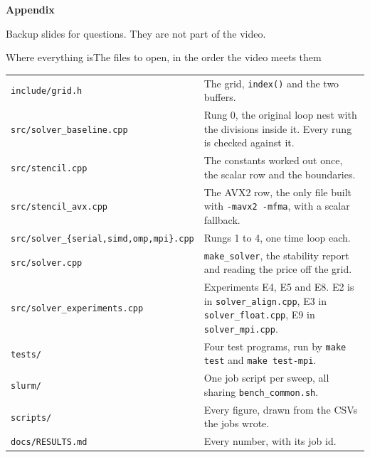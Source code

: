 \documentclass[aspectratio=169,11pt]{beamer}
\newcounter{siglastframe}
\newif\ifsigappendix
\newcommand{\sigbackupbegin}{\setcounter{siglastframe}{\value{framenumber}}\sigappendixtrue}
\begin{document}

\appendix
\sigbackupbegin

\begin{frame}[plain]
  \vfill
  \centering
  {\Large\color{sigink}\bfseries Appendix}
  \par\vspace{0.6em}
  {\color{sigslate} Backup slides for questions. They are not part of the video.}
  \vfill
\end{frame}

\begin{frame}{Where everything is}{The files to open, in the order the video meets them}
  {\footnotesize
  \renewcommand{\arraystretch}{1.12}
  \begin{tabularx}{\linewidth}{@{}l X@{}}
    \toprule
    \texttt{include/grid.h} & The grid, \texttt{index()} and the two buffers. \\
    \texttt{src/solver\_baseline.cpp} & Rung 0, the original loop nest with the divisions inside it. Every rung is checked against it. \\
    \texttt{src/stencil.cpp} & The constants worked out once, the scalar row and the boundaries. \\
    \texttt{src/stencil\_avx.cpp} & The AVX2 row, the only file built with \texttt{-mavx2 -mfma}, with a scalar fallback. \\
    \texttt{src/solver\_\{serial,simd,omp,mpi\}.cpp} & Rungs 1 to 4, one time loop each. \\
    \texttt{src/solver.cpp} & \texttt{make\_solver}, the stability report and reading the price off the grid. \\
    \texttt{src/solver\_experiments.cpp} & Experiments E4, E5 and E8. E2 is in \texttt{solver\_align.cpp}, E3 in \texttt{solver\_float.cpp}, E9 in \texttt{solver\_mpi.cpp}. \\
    \texttt{tests/} & Four test programs, run by \texttt{make test} and \texttt{make test-mpi}. \\
    \texttt{slurm/} & One job script per sweep, all sharing \texttt{bench\_common.sh}. \\
    \texttt{scripts/} & Every figure, drawn from the CSVs the jobs wrote. \\
    \texttt{docs/RESULTS.md} & Every number, with its job id. \\
    \bottomrule
  \end{tabularx}}
\end{frame}
\end{document}

